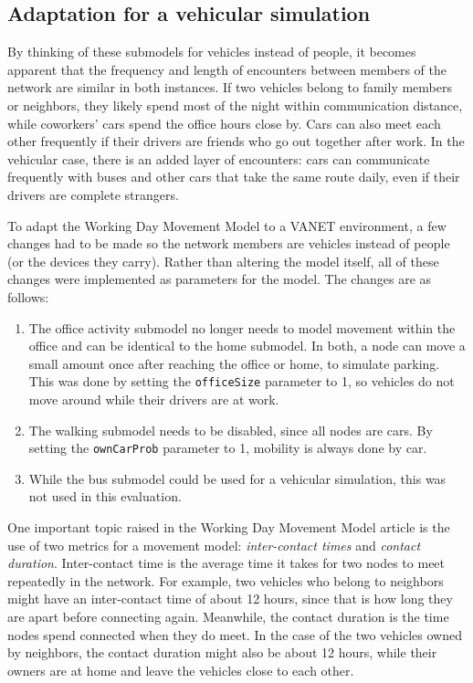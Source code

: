 \subsection{Adaptation for a vehicular simulation}
By thinking of these submodels for vehicles instead of people, it becomes apparent that the frequency and length of encounters between members of the network are similar in both instances.
If two vehicles belong to family members or neighbors, they likely spend most of the night within communication distance, while coworkers' cars spend the office hours close by.
Cars can also meet each other frequently if their drivers are friends who go out together after work.
In the vehicular case, there is an added layer of encounters: cars can communicate frequently with buses and other cars that take the same route daily, even if their drivers are complete strangers.

To adapt the Working Day Movement Model to a VANET environment, a few changes had to be made so the network members are vehicles instead of people (or the devices they carry). 
Rather than altering the model itself, all of these changes were implemented as parameters for the model.
The changes are as follows:
\begin{enumerate}
\item
The office activity submodel no longer needs to model movement within the office and can be identical to the home submodel.
In both, a node can move a small amount once after reaching the office or home, to simulate parking.
This was done by setting the \texttt{officeSize} parameter to 1, so vehicles do not move around while their drivers are at work.
\item
The walking submodel needs to be disabled, since all nodes are cars.
By setting the \texttt{ownCarProb} parameter to 1, mobility is always done by car.
\item
While the bus submodel could be used for a vehicular simulation, this was not used in this evaluation.
\end{enumerate}

One important topic raised in the Working Day Movement Model article is the use of two metrics for a movement model: \textit{inter-contact times} and \textit{contact duration}.
Inter-contact time is the average time it takes for two nodes to meet repeatedly in the network.
For example, two vehicles who belong to neighbors might have an inter-contact time of about 12 hours, since that is how long they are apart before connecting again.
Meanwhile, the contact duration is the time nodes spend connected when they do meet.
In the case of the two vehicles owned by neighbors, the contact duration might also be about 12 hours, while their owners are at home and leave the vehicles close to each other.

